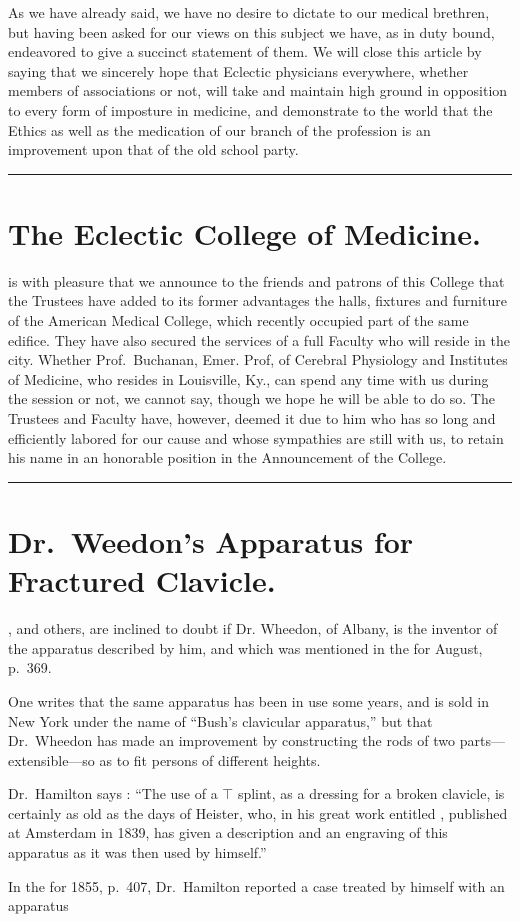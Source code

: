 
As we have already said, we have no desire to dictate to our medical
brethren, but having been asked for our views on this subject we
have, as in duty bound, endeavored to give a succinct statement of them.
We will close this article by saying that we sincerely hope that Eclectic
physicians everywhere, whether members of associations or not, will
take and maintain high ground in opposition to every form of imposture
in medicine, and demonstrate to the world that the Ethics as well
as the medication of our branch of the profession is an improvement
upon that of the old school party.

\fancybreak{*}

\section*{The Eclectic College of Medicine.}

 is with pleasure that we announce to the friends and patrons of this
College that the Trustees have added to its former advantages the halls,
fixtures and furniture of the American Medical College, which recently
occupied part of the same edifice. They have also secured the services
of a full Faculty who will reside in the city. Whether Prof.~Buchanan,
Emer. Prof, of Cerebral Physiology and Institutes of Medicine, who
resides in Louisville, Ky., can spend any time with us during the session
or not, we cannot say, though we hope he will be able to do so. The
Trustees and Faculty have, however, deemed it due to him who has so
long and efficiently labored for our cause and whose sympathies are still
with us, to retain his name in an honorable position in the Announcement
of the College.

\fancybreak{*}

\section*{Dr.\ Weedon's Apparatus for Fractured Clavicle.}

, and others, are inclined to doubt if Dr.
Wheedon, of Albany, is the inventor of the apparatus described by him,
and which was mentioned in the  for August, p.\ 369.

One writes that the same apparatus has been in use some years, and
is sold in New York under the name of ``Bush's clavicular apparatus,''
but that Dr.\ Wheedon has made an improvement by constructing the
rods of two parts---extensible---so as to fit persons of different heights.

Dr.\ Hamilton says : ``The use of a $\top$ splint, as a dressing for a broken
clavicle, is certainly as old as the days of Heister, who, in his great work
entitled , published at Amsterdam in 1839, has
given a description and an engraving of this apparatus as it was then
used by himself.''

In the  for 1855,
p.~407, Dr.\ Hamilton reported a case treated by himself with an apparatus\endinput
